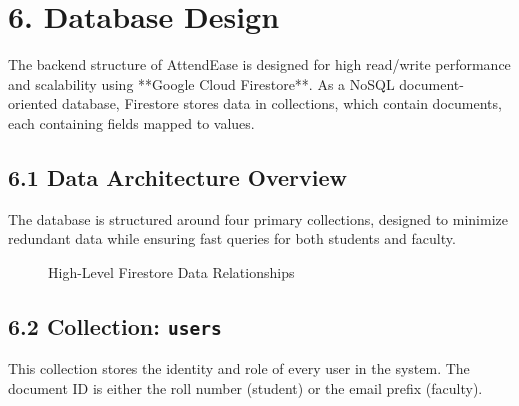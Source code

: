 \documentclass[12pt,a4paper]{report}
\begin{document}
\chapter*{6. Database Design}

The backend structure of AttendEase is designed for high read/write performance and scalability using **Google Cloud Firestore**. As a NoSQL document-oriented database, Firestore stores data in collections, which contain documents, each containing fields mapped to values.

\section*{6.1 Data Architecture Overview}
The database is structured around four primary collections, designed to minimize redundant data while ensuring fast queries for both students and faculty.

\begin{figure}[H]
    \centering
    \caption{High-Level Firestore Data Relationships}
\end{figure}

\section*{6.2 Collection: \texttt{users}}
This collection stores the identity and role of every user in the system. The document ID is either the roll number (student) or the email prefix (faculty).
\end{document}
